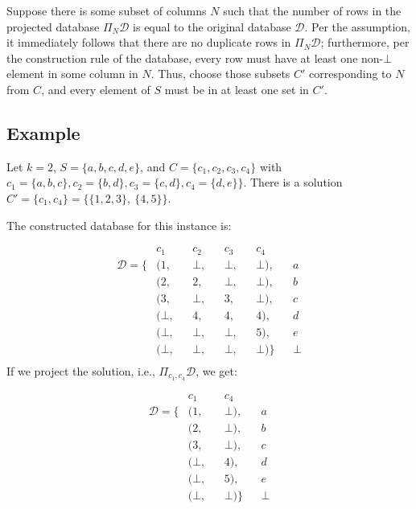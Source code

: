 \documentclass[12pt]{llncs}
\newcommand{\cD}{\mathcal{D}}
\newcommand{\Proj}[1]{\Pi_{#1}}
\begin{document}
Suppose there is some subset of columns $N$ such that the number of rows in the projected database $\Proj{N} \cD$ is equal to the original database $\cD$. Per the assumption, it immediately follows that there are no duplicate rows in $\Proj{N} \cD$; furthermore, per the construction rule of the database, every row must have at least one non-$\bot$ element in some column in $N$. Thus, choose those subsets $C'$ corresponding to $N$ from $C$, and every element of $S$ must be in at least one set in $C'$.

\subsection{Example}
Let $k=2$, $S = \{a,b,c,d,e\}$, and $C = \{c_1,c_2,c_3,c_4\}$ with $c_1 = \{a,b,c\}, c_2 = \{b,d\}, c_3 = \{c,d\}, c_4 = \{d,e\}\}$. There is a solution $C' = \{c_1,c_4\} = \{\{1,2,3\},~\{4,5\}\}$.

The constructed database for this instance is:

\begin{align*}
                 &  c_1   && c_2   && c_3   && c_4     &&\\
\mathcal{D} = \{ & (1,    && \bot, && \bot, && \bot),  && a\\
                 & (2,    && 2,    && \bot, && \bot),  && b\\
                 & (3,    && \bot, && 3,    && \bot),  && c\\
                 & (\bot, && 4,    && 4,    && 4   ),  && d\\
                 & (\bot, && \bot, && \bot, && 5   ),  && e\\
                 & (\bot, && \bot, && \bot, && \bot)\} && \bot\\
\end{align*}
\vspace*{10pt}
If we project the solution, i.e., $\Pi_{c_1,c_4} \mathcal{D}$, we get:

\begin{align*}
                 &  c_1   && c_4     &&\\
\mathcal{D} = \{ & (1,    && \bot),  && a\\
                 & (2,    && \bot),  && b\\
                 & (3,    && \bot),  && c\\
                 & (\bot, && 4   ),  && d\\
                 & (\bot, && 5   ),  && e\\
                 & (\bot, && \bot)\} && \bot\\
\end{align*}
\end{document}

